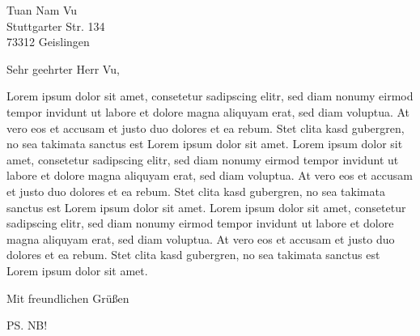 \documentclass[11pt]{letter}
\begin{document}
	\begin{letter}{Tuan Nam Vu\\ Stuttgarter Str. 134\\ 73312 Geislingen}
		\opening{Sehr geehrter Herr Vu,}
		Lorem ipsum dolor sit amet, consetetur sadipscing elitr, sed diam nonumy eirmod tempor invidunt ut labore et dolore magna aliquyam erat, sed diam voluptua. At vero eos et accusam et justo duo dolores et ea rebum. Stet clita kasd gubergren, no sea takimata sanctus est Lorem ipsum dolor sit amet. Lorem ipsum dolor sit amet, consetetur sadipscing elitr, sed diam nonumy eirmod tempor invidunt ut labore et dolore magna aliquyam erat, sed diam voluptua. At vero eos et accusam et justo duo dolores et ea rebum. Stet clita kasd gubergren, no sea takimata sanctus est Lorem ipsum dolor sit amet. Lorem ipsum dolor sit amet, consetetur sadipscing elitr, sed diam nonumy eirmod tempor invidunt ut labore et dolore magna aliquyam erat, sed diam voluptua. At vero eos et accusam et justo duo dolores et ea rebum. Stet clita kasd gubergren, no sea takimata sanctus est Lorem ipsum dolor sit amet. 
		\closing{Mit freundlichen Grüßen}
		\ps{NB!}
		\vfill
	\end{letter}
\end{document}
